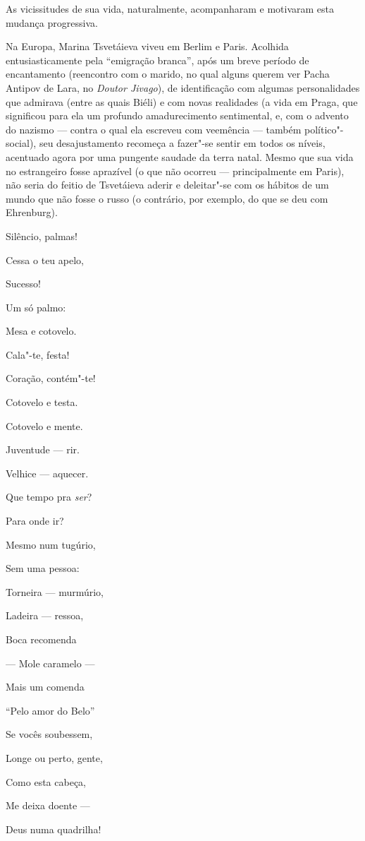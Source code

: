 As vicissitudes de sua vida, naturalmente, acompanharam e motivaram esta
mudança progressiva.

Na Europa, Marina Tsvetáieva viveu em Berlim e Paris. Acolhida
entusiasticamente pela ``emigração branca'', após um breve período de
encantamento (reencontro com o marido, no qual alguns querem ver Pacha
Antipov de Lara, no \emph{Doutor Jivago}), de identificação com algumas
personalidades que admirava (entre as quais Biéli) e com novas
realidades (a vida em Praga, que significou para ela um profundo
amadurecimento sentimental, e, com o advento do nazismo --- contra o qual
ela escreveu com veemência --- também político"-social), seu
desajustamento recomeça a fazer"-se sentir em todos os níveis, acentuado
agora por uma pungente saudade da terra natal. Mesmo que sua vida no
estrangeiro fosse aprazível (o que não ocorreu --- principalmente em
Paris), não seria do feitio de Tsvetáieva aderir e deleitar"-se com os
hábitos de um mundo que não fosse o russo (o contrário, por exemplo, do
que se deu com Ehrenburg).

Silêncio, palmas!

Cessa o teu apelo,

Sucesso!

Um só palmo:

Mesa e cotovelo.

Cala"-te, festa!

Coração, contém"-te!

Cotovelo e testa.

Cotovelo e mente.

Juventude --- rir.

Velhice --- aquecer.

Que tempo pra \emph{ser}?

Para onde ir?

Mesmo num tugúrio,

Sem uma pessoa:

Torneira --- murmúrio,

Ladeira --- ressoa,

Boca recomenda

--- Mole caramelo ---

Mais um comenda

``Pelo amor do Belo''

Se vocês soubessem,

Longe ou perto, gente,

Como esta cabeça,

Me deixa doente ---

Deus numa quadrilha!

